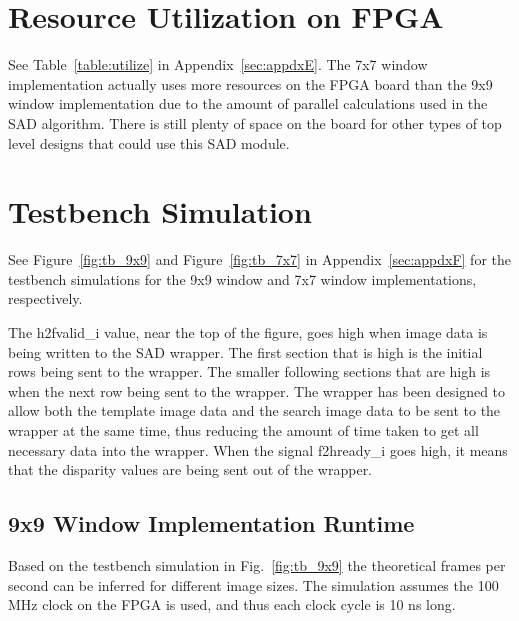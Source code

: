 \section{Resource Utilization on FPGA}
\label{sec:utilize}

See Table~\ref{table:utilize} in Appendix~\ref{sec:appdxE}. The 7x7 window implementation actually uses more resources on the FPGA board than the 9x9 window implementation due to the amount of parallel calculations used in the SAD algorithm. There is still plenty of space on the board for other types of top level designs that could use this SAD module.

\section{Testbench Simulation}
\label{sec:testbench}

See Figure~\ref{fig:tb_9x9} and Figure~\ref{fig:tb_7x7} in Appendix~\ref{sec:appdxF} for the testbench simulations for the 9x9 window and 7x7 window implementations, respectively.

The h2fvalid\_i value, near the top of the figure, goes high when image data is being written to the SAD wrapper. The first section that is high is the initial rows being sent to the wrapper. The smaller following sections that are high is when the next row being sent to the wrapper. The wrapper has been designed to allow both the template image data and the search image data to be sent to the wrapper at the same time, thus reducing the amount of time taken to get all necessary data into the wrapper. When the signal f2hready\_i goes high, it means that the disparity values are being sent out of the wrapper.

\subsection{9x9 Window Implementation Runtime}
\label{sec:testbench9x9}

Based on the testbench simulation in Fig.~\ref{fig:tb_9x9} the theoretical frames per second can be inferred for different image sizes. The simulation assumes the 100 MHz clock on the FPGA is used, and thus each clock cycle is 10 ns long.

